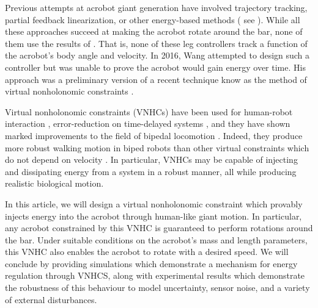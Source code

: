 \documentclass[journal,twoside,web]{ieeecolor}
\begin{document}
Previous attempts at acrobot giant generation have involved
trajectory tracking, partial feedback linearization, or other energy-based
methods
( see
\cite{energy_pumping_robotic_swinging,swingup_giant_acrobot,dynamical_servo_acrobot_vc,control_giant_two_link_gymnastic_robot}
).
While all these approaches succeed at making the acrobot rotate around the
bar, none of them use the results of \cite{pendulum_length_giant_gymnastics}.
That is, none of these leg controllers track a function of the acrobot's body
angle and velocity.
In 2016, Wang attempted to design such a controller \cite{xingbo_thesis}
but was unable to prove the acrobot would gain energy over time.
His approach was a preliminary version of a recent technique know as the method
of virtual nonholonomic constraints \cite{hybrid_zero_dynamics_bipedal_nhvcs}.

Virtual nonholonomic constraints (VNHCs) have been used for human-robot interaction
\cite{vnhc_human_robot_cooperation,psd_based_vnhc_redundant_manipulator,haptic_vnhc},
error-reduction on time-delayed systems \cite{vnhc_time_delay_teleop},
and they have shown marked improvements to the field of bipedal locomotion 
\cite{nhvc_dynamic_walking,
hybrid_zero_dynamics_bipedal_nhvcs,output_nhvc_bipedal_control}.
Indeed, they produce more robust walking motion in biped robots than
other virtual constraints which do not depend on velocity
\cite{nhvc_incline_walking}.
In particular, VNHCs may be capable of injecting and
dissipating energy from a system in a robust manner, all while producing realistic
biological motion. 

In this article, we will design a virtual nonholonomic constraint which provably
injects energy into the acrobot through human-like giant motion.
In particular, any acrobot constrained by this VNHC is guaranteed to perform
rotations around the bar.
Under suitable conditions on the acrobot's mass and length parameters, this VNHC
also enables the acrobot to rotate with a desired speed.
We will conclude by providing simulations which demonstrate a mechanism for
energy regulation through VNHCS, along with experimental results which
demonstrate the robustness of this behaviour to model uncertainty, sensor noise,
and a variety of external disturbances. 
\end{document}
